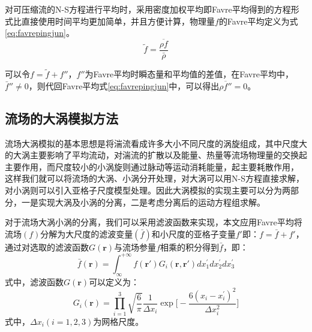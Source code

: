 对可压缩流的N-S方程进行平均时，采用密度加权平均即Favre平均得到的方程形式比直接使用时间平均更加简单，并且方便计算，物理量$f$的Favre平均定义为式\eqref{eq:favrepingjun}。
\begin{equation}
\tilde{f}=\frac{\overline{\rho f}}{\bar{\rho}}
\label{eq:favrepingjun}
\end{equation}

可以令$f=\tilde{f}+f''$，$f''$为Favre平均时瞬态量和平均值的差值，在Favre平均中，$\bar{f}''\neq 0$，则代回Favre平均式\eqref{eq:favrepingjun}中，可以得出$\overline{\rho f''}=0$。
\subsection{流场的大涡模拟方法}
流场大涡模拟的基本思想是将湍流看成许多大小不同尺度的涡旋组成，其中尺度大的大涡主要影响了平均流动，对湍流的扩散以及能量、热量等流场物理量的交换起主要作用，而尺度较小的小涡旋则通过脉动等运动消耗能量，起主要耗散作用，
这样我们就可以将流场的大涡、小涡分开处理，对大涡可以用N-S方程直接求解，对小涡则可以引入亚格子尺度模型处理。因此大涡模拟的实现主要可以分为两部分，一是实现大涡及小涡的分离，二是考虑分离后的运动方程组求解。

对于流场大涡小涡的分离，我们可以采用滤波函数来实现，本文应用Favre平均将流场$(f)$分解为大尺度的滤波变量$(\bar{f})$和小尺度的亚格子变量$f'$即：$f=\bar{f}+f'$，通过对选取的滤波函数$G(\mathbf{r})$与流场参量$f$相乘的积分得到$\bar{f}$，即：
\begin{equation}
\bar{f}(\mathbf{r})=\int^{+\infty}_{\infty}f(\mathbf{r}')G_i(\mathbf{r},\mathbf{r}')dx_1^{'}dx_2^{'} dx_3^{'}
\label{eq:lvbo}
\end{equation}
式中，滤波函数$G(\mathbf{r})$可以定义为：
\begin{equation}
G_i(\mathbf{r})=\prod_{i=1}^3\sqrt{\frac{6}{\pi}}\frac{1}{\Delta x_i}\exp\Big[-\frac{6(x_i-x_i^{'})^{2}}{\Delta x_i^{2}}\Big]
\label{eq:lvbohanshu}
\end{equation}
式中，$\Delta x_i(i=1,2,3)$为网格尺度。

